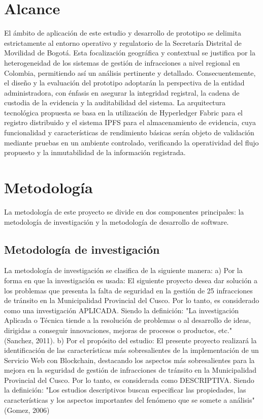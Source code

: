 \documentclass[
    letterpaper, 
    man,   
    spanish,
    12pt,
    donotrepeattitle,
    floatsintext,
    hidelinks %
]{apa7}
\begin{document}
\section{Alcance}
 El ámbito de aplicación de este estudio y desarrollo de prototipo se delimita estrictamente al entorno operativo y regulatorio de la Secretaría Distrital de Movilidad de Bogotá. Esta focalización geográfica y contextual se justifica por la heterogeneidad de los sistemas de gestión de infracciones a nivel regional en Colombia, permitiendo así un análisis pertinente y detallado. Consecuentemente, el diseño y la evaluación del prototipo adoptarán la perspectiva de la entidad administradora, con énfasis en asegurar la integridad registral, la cadena de custodia de la evidencia y la auditabilidad del sistema. La arquitectura tecnológica propuesta se basa en la utilización de Hyperledger Fabric para el registro distribuido y el sistema IPFS para el almacenamiento de evidencia, cuya funcionalidad y características de rendimiento básicas serán objeto de validación mediante pruebas en un ambiente controlado, verificando la operatividad del flujo propuesto y la inmutabilidad de la información registrada. 

  \section{Metodología }
  La metodología de este proyecto se divide en dos componentes principales: la metodología de investigación y la metodología de desarrollo de software.  

    \subsection{Metodología de investigación }
 La metodología de investigación se clasifica de la siguiente manera: a) Por la forma en que la investigación es usada: El siguiente proyecto desea dar solución a los problemas que presenta la falta de seguridad en la gestión de 25 infracciones de tránsito en la Municipalidad Provincial del Cusco. Por lo tanto, es considerado como una investigación APLICADA. Siendo la definición: "La investigación Aplicada o Técnica tiende a la resolución de problemas o al desarrollo de ideas, dirigidas a conseguir innovaciones, mejoras de procesos o productos, etc." (Sanchez, 2011). b) Por el propósito del estudio: El presente proyecto realizará la identificación de las características más sobresalientes de la implementación de un Servicio Web con Blockchain, destacando los aspectos más sobresalientes para la mejora en la seguridad de gestión de infracciones de tránsito en la Municipalidad Provincial del Cusco. Por lo tanto, es considerada como DESCRIPTIVA. Siendo la definición: "Los estudios descriptivos buscan especificar las propiedades, las características y los aspectos importantes del fenómeno que se somete a análisis" (Gomez, 2006) 
\end{document}
